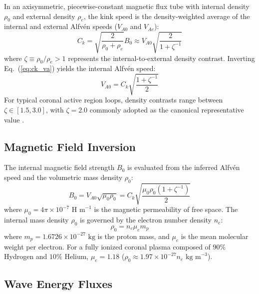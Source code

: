 \documentclass[11pt,a4paper]{article}
\begin{document}
In an axisymmetric, piecewise-constant magnetic flux tube with internal density $\rho_0$ and external density $\rho_e$, the kink speed is the density-weighted average of the internal and external Alfvén speeds ($V_{A0}$ and $V_{Ae}$):
\begin{equation}
    C_k = \sqrt{\frac{2}{\rho_0 + \rho_e}} B_0 \approx V_{A0} \sqrt{\frac{2}{1 + \zeta^{-1}}}
    \label{eq:ck_va}
\end{equation}
where $\zeta \equiv \rho_0 / \rho_e > 1$ represents the internal-to-external density contrast. Inverting Eq.~(\ref{eq:ck_va}) yields the internal Alfvén speed:
\begin{equation}
    V_{A0} = C_k \sqrt{\frac{1 + \zeta^{-1}}{2}}
    \label{eq:va_inversion}
\end{equation}
For typical coronal active region loops, density contrasts range between $\zeta \in [1.5, 3.0]$, with $\zeta = 2.0$ commonly adopted as the canonical representative value \citep{Nakariakov2001, Shrivastav2024}.

\subsection{Magnetic Field Inversion}

The internal magnetic field strength $B_0$ is evaluated from the inferred Alfvén speed and the volumetric mass density $\rho_0$:
\begin{equation}
    B_0 = V_{A0} \sqrt{\mu_0 \rho_0} = C_k \sqrt{\frac{\mu_0 \rho_0 (1 + \zeta^{-1})}{2}}
    \label{eq:b_inversion}
\end{equation}
where $\mu_0 = 4\pi \times 10^{-7}\text{ H m}^{-1}$ is the magnetic permeability of free space. The internal mass density $\rho_0$ is governed by the electron number density $n_e$:
\begin{equation}
    \rho_0 = n_e \mu_e m_p
    \label{eq:mass_density}
\end{equation}
where $m_p = 1.6726 \times 10^{-27}\text{ kg}$ is the proton mass, and $\mu_e$ is the mean molecular weight per electron. For a fully ionized coronal plasma composed of $90\%$ Hydrogen and $10\%$ Helium, $\mu_e = 1.18$ ($\rho_0 \approx 1.97 \times 10^{-27} n_e\text{ kg m}^{-3}$).

\subsection{Wave Energy Fluxes}
\end{document}
